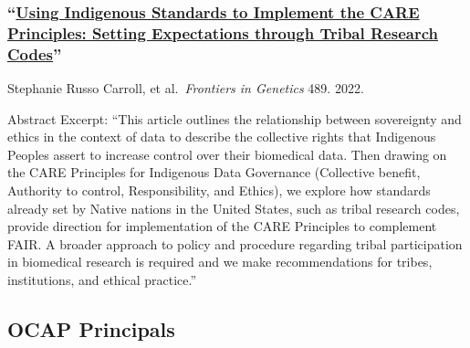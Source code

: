 \documentclass[
]{book}
\begin{document}
\hypertarget{using-indigenous-standards-to-implement-the-care-principles-setting-expectations-through-tribal-research-codes}{%
\subsubsection*{\texorpdfstring{``\href{https://www.frontiersin.org/articles/10.3389/fgene.2022.823309/full?\&utm_source=Email_to_authors_\&utm_medium=Email\&utm_content=T1_11.5e1_author\&utm_campaign=Email_publication\&field=\&journalName=Frontiers_in_Genetics\&id=823309}{Using Indigenous Standards to Implement the CARE Principles: Setting Expectations through Tribal Research Codes}''}{``Using Indigenous Standards to Implement the CARE Principles: Setting Expectations through Tribal Research Codes''}}\label{using-indigenous-standards-to-implement-the-care-principles-setting-expectations-through-tribal-research-codes}}

Stephanie Russo Carroll, et al.~\emph{Frontiers in Genetics} 489. 2022.

Abstract Excerpt: ``This article outlines the relationship between sovereignty and ethics in the context of data to describe the collective rights that Indigenous Peoples assert to increase control over their biomedical data. Then drawing on the CARE Principles for Indigenous Data Governance (Collective benefit, Authority to control, Responsibility, and Ethics), we explore how standards already set by Native nations in the United States, such as tribal research codes, provide direction for implementation of the CARE Principles to complement FAIR. A broader approach to policy and procedure regarding tribal participation in biomedical research is required and we make recommendations for tribes, institutions, and ethical practice.''

\hypertarget{ocap-principals}{%
\subsection{OCAP Principals}\label{ocap-principals}}
\end{document}
